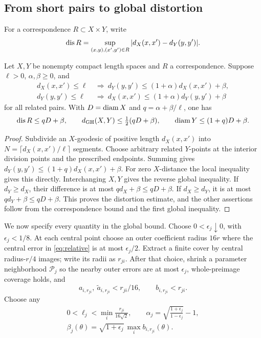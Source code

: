 \subsection{From short pairs to global distortion}
For a correspondence \(R\subset X\times Y\), write
\[
 \operatorname{dis} R=\sup_{(x,y),(x',y')\in R}
          |d_X(x,x')-d_Y(y,y')|.
\]

\begin{lemma}\label{lem:short-correspondence}
Let \(X,Y\) be nonempty compact length spaces and \(R\) a
correspondence. Suppose \(\ell>0\), \(\alpha,\beta\ge0\), and
\[
 \begin{aligned}
 d_X(x,x')\le\ell&\ \Longrightarrow\
 d_Y(y,y')\le(1+\alpha)d_X(x,x')+\beta,\\
 d_Y(y,y')\le\ell&\ \Longrightarrow\
 d_X(x,x')\le(1+\alpha)d_Y(y,y')+\beta
 \end{aligned}
\]
for all related pairs. With \(D=\operatorname{diam} X\) and
\(q=\alpha+\beta/\ell\), one has
\begin{equation}\label{eq:short-bound}
 \operatorname{dis} R\le qD+\beta,\qquad
 d_{\rm GH}(X,Y)\le\tfrac12(qD+\beta),\qquad
 \operatorname{diam} Y\le(1+q)D+\beta .
\end{equation}
\end{lemma}

\begin{proof}
Subdivide an \(X\)-geodesic of positive length \(d_X(x,x')\)
into \(N=\lceil d_X(x,x')/\ell\rceil\) segments. Choose arbitrary
related \(Y\)-points at the interior division points and the
prescribed endpoints. Summing gives
\(d_Y(y,y')\le(1+q)d_X(x,x')+\beta\).
For zero \(X\)-distance the local inequality gives this directly.
Interchanging \(X,Y\) gives the reverse global inequality.
If \(d_Y\ge d_X\), their difference is at most \(qd_X+\beta\le qD+\beta\).
If \(d_X\ge d_Y\), it is at most \(qd_Y+\beta\le qD+\beta\).
This proves the distortion estimate, and the other assertions
follow from the correspondence bound and the first global inequality.
\end{proof}

We now specify every quantity in the global bound. Choose
\(0<\epsilon_j\downarrow0\), with \(\epsilon_j<1/8\).
At each central point choose an outer coefficient radius \(16r\)
where the central error in \eqref{eq:relative} is at most
\(\epsilon_j/2\). Extract a finite cover by central radius-\(r/4\)
images; write its radii as \(r_{ji}\).
After that choice, shrink a parameter neighborhood \(\mathcal P_j\)
so the nearby outer errors are at most \(\epsilon_j\), whole-preimage
coverage holds, and
\[
 a_{i,r_{ji}},\ \widetilde a_{i,r_{ji}}<r_{ji}/16,
 \qquad b_{i,r_{ji}}<r_{ji}.
\]
Choose any
\begin{equation}\label{eq:global-parameters}
 \begin{gathered}
 0<\ell_j<\min_i\frac{r_{ji}}{16\sqrt2},\qquad
 \alpha_j=\sqrt{\frac{1+\epsilon_j}{1-\epsilon_j}}-1,\\
 \beta_j(\theta)=\sqrt{1+\epsilon_j}\,
                  \max_i b_{i,r_{ji}}(\theta).
 \end{gathered}
\end{equation}


